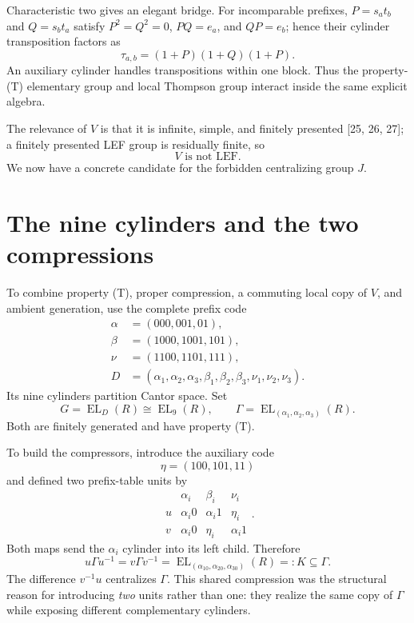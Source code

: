 \documentclass[10pt,openany]{book}
\newcommand{\refnum}[1]{\textnormal{[#1]}}
\newcommand{\EL}{\operatorname{EL}}
\begin{document}
Characteristic two gives an elegant bridge. For incomparable prefixes, $P=s_at_b$ and $Q=s_bt_a$ satisfy $P^2=Q^2=0$, $PQ=e_a$, and $QP=e_b$; hence their cylinder transposition factors as
\[
 \tau_{a,b}=(1+P)(1+Q)(1+P).
\]
An auxiliary cylinder handles transpositions within one block. Thus the property-(T) elementary group and local Thompson group interact inside the same explicit algebra.

The relevance of $V$ is that it is infinite, simple, and finitely presented \refnum{25, 26, 27}; a finitely presented LEF group is residually finite, so
\[
 V\text{ is not LEF}.
\]
We now have a concrete candidate for the forbidden centralizing group $J$.

\section{The nine cylinders and the two compressions}

To combine property (T), proper compression, a commuting local copy of $V$, and ambient generation, use the complete prefix code
\[
 \begin{aligned}
 \alpha&=(000,001,01),\\
 \beta&=(1000,1001,101),\\
 \nu&=(1100,1101,111),\\
 D&=(\alpha_1,\alpha_2,\alpha_3,\beta_1,\beta_2,\beta_3,\nu_1,\nu_2,\nu_3).
 \end{aligned}
\]
Its nine cylinders partition Cantor space. Set
\[
 G=\EL_D(R)\cong\EL_9(R),
 \qquad
 \Gamma=\EL_{(\alpha_1,\alpha_2,\alpha_3)}(R).
\]
Both are finitely generated and have property (T).

To build the compressors, introduce the auxiliary code
\[
 \eta=(100,101,11)
\]
and defined two prefix-table units by
\[
 \begin{array}{c|ccc}
   & \alpha_i & \beta_i & \nu_i \\
 \hline
 u & \alpha_i0 & \alpha_i1 & \eta_i \\
 v & \alpha_i0 & \eta_i & \alpha_i1
 \end{array}.
\]
Both maps send the $\alpha_i$ cylinder into its left child. Therefore
\[
 u\Gamma u^{-1}=v\Gamma v^{-1}
 =\EL_{(\alpha_10,\alpha_20,\alpha_30)}(R)=:K\subseteq\Gamma.
\]
The difference $v^{-1}u$ centralizes $\Gamma$. This shared compression was the structural reason for introducing \emph{two} units rather than one: they realize the same copy of $\Gamma$ while exposing different complementary cylinders.
\end{document}

